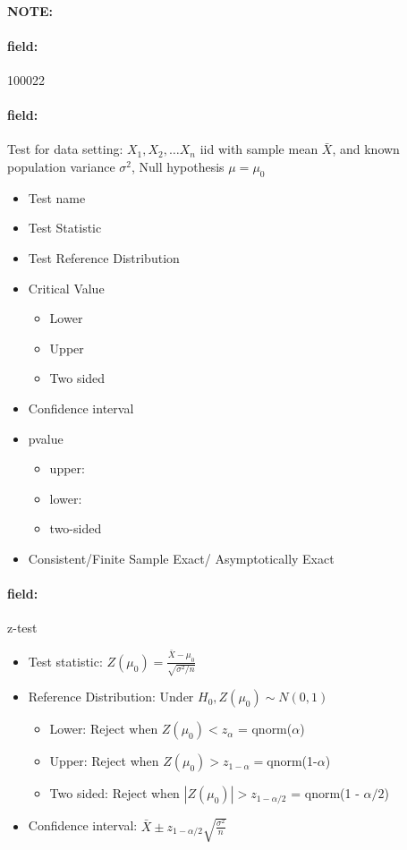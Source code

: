 \documentclass[12pt]{article}
\newenvironment{note}{\paragraph{NOTE:}}{}
\newenvironment{field}{\paragraph{field:}}{}
\begin{document}
\begin{note} \begin{field} \tiny 100022 \end{field}
 \begin{field}
  Test for data setting: $X_1, X_2, \ldots X_n$ iid with sample mean $\bar{X}$, and known population variance $\sigma^2$, Null hypothesis $\mu = \mu_0$

  \begin{itemize}
   \item Test name
   \item Test Statistic
   \item Test Reference Distribution
   \item Critical Value
         \begin{itemize}
          \item Lower
          \item Upper
          \item Two sided
         \end{itemize}
   \item Confidence interval
   \item pvalue
         \begin{itemize}
          \item upper:
          \item lower:
          \item two-sided
         \end{itemize}
   \item Consistent/Finite Sample Exact/ Asymptotically Exact
  \end{itemize}
 \end{field}
 \begin{field}
  z-test
  \begin{itemize}
   \item Test statistic: $Z(\mu_0) = \frac{\bar{X} - \mu_0}{\sqrt{\sigma^2/n}}$
   \item Reference Distribution: Under $H_0, Z(\mu_0) \sim N(0,1)$
         \begin{itemize}
          \item Lower: Reject when $Z(\mu_0) < z_{\alpha}$ = qnorm($\alpha$)
          \item Upper: Reject when $Z(\mu_0) > z_{1 - \alpha} = $qnorm(1-$\alpha$)
          \item Two sided:  Reject when $|Z(\mu_0)| > z_{1 - \alpha/2}$ = qnorm(1 - $\alpha/2$)
         \end{itemize}
   \item Confidence interval: $ \bar{X} \pm z_{1 - \alpha/2}\sqrt{\frac{\sigma^2}{n}}$

\end{itemize}
\end{field}
\end{note}
\end{document}
